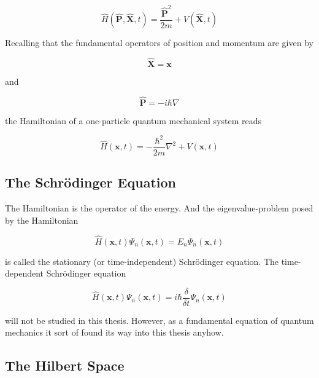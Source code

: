 \begin{equation*}
  \hat{H}(\mathbf{\hat{P}}, \mathbf{\hat{X}}, t) =
  \frac{\mathbf{\hat{P}}^2}{2m} + V(\mathbf{\hat{X}}, t)
\end{equation*}

Recalling that the fundamental operators of position and momentum are
given by 

\begin{equation*}
  \mathbf{\hat{X}} = \mathbf{x}
\end{equation*}

and

\begin{equation*}
  \mathbf{\hat{P}} = -i\hbar \nabla
\end{equation*}

the Hamiltonian of a one-particle quantum mechanical system reads

\begin{equation*}
  \hat{H}(\mathbf{x}, t) = -\frac{\hbar^2}{2m} \nabla^2 +
  V(\mathbf{x}, t)
\end{equation*}


\subsection{The Schr\"odinger Equation}

The Hamiltonian is the operator of the energy. And the
eigenvalue-problem posed by the Hamiltonian

\begin{equation*}
  \hat{H}(\mathbf{x}, t) \Psi_n(\mathbf{x}, t)  
  = E_n \Psi_n(\mathbf{x}, t) 
\end{equation*}

is called the stationary (or time-independent) Schr\"odinger
equation. The time-dependent Schr\"odinger equation

\begin{equation*}
  \hat{H}(\mathbf{x}, t) \Psi_n(\mathbf{x}, t)  
  = i\hbar \frac{\delta}{\delta t} \Psi_n(\mathbf{x}, t) 
\end{equation*}

will not be studied in this thesis. However, as a fundamental equation
of quantum mechanics it sort of found its way into this thesis anyhow.

\subsection{The Hilbert Space}


